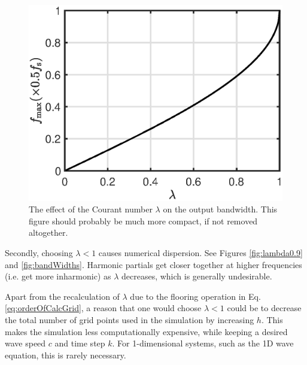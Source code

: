 \documentclass[dvipsnames, reprint]{JASA}
\def\SWcomment[#1]{\textcolor{Bittersweet}{#1}}
\begin{document}
\begin{figure}
\includegraphics[width=\reprintcolumnwidth]{bandwidthPlot}
\caption{\label{fig:bandWidthFormula}{The effect of the Courant number $\lambda$ on the output bandwidth. \SWcomment[This figure should probably be much more compact, if not removed altogether.]}}
\end{figure} 

Secondly, choosing $\lambda < 1$ causes numerical dispersion. See Figures \ref{fig:lambda0.9} and \ref{fig:bandWidths}. Harmonic partials get closer together at higher frequencies (i.e. get more inharmonic) as $\lambda$ decreases, which is generally undesirable.

Apart from the recalculation of $\lambda$ due to the flooring operation in Eq. \eqref{eq:orderOfCalcGrid}, a reason that one would choose $\lambda < 1$ could be to decrease the total number of grid points used in the simulation by increasing $h$. This makes the simulation less computationally expensive, while keeping a desired wave speed $c$ and time step $k$. For 1-dimensional systems, such as the 1D wave equation, this is rarely necessary.
\end{document}
